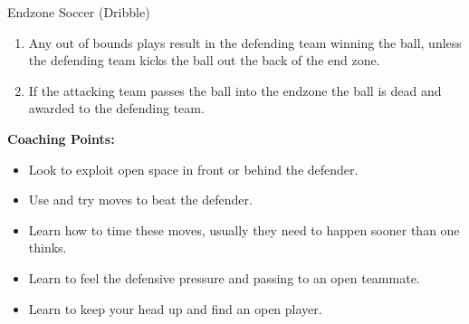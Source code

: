 \begin{evenBlock}{Endzone Soccer (Dribble)}
\begin{minipage}[t]{\linewidth}
\begin{minipage}{.6\linewidth}
\begin{enumerate}
            \item Any out of bounds plays result in the defending team winning the ball, unless the defending team kicks the ball out the back of the end zone.
            \item If the attacking team passes the ball into the endzone the ball is dead and awarded to the defending team.
        \end{enumerate}
    \end{minipage}
\end{minipage}
\raggedright
    \textbf{Coaching Points:}
    \begin{itemize}
        \setlength{\itemsep}{0pt}
        \setlength{\parskip}{0pt}
        \setlength{\parsep}{0pt}
        \item Look to exploit open space in front or behind the defender.
        \item Use and try moves to beat the defender.
        \item Learn how to time these moves, usually they need to happen sooner than one thinks.
        \item Learn to feel the defensive pressure and passing to an open teammate.
        \item Learn to keep your head up and find an open player.

    \end{itemize}

\end{evenBlock}